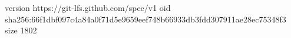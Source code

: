 version https://git-lfs.github.com/spec/v1
oid sha256:66f1dbf097c4a84a0f71d5e9659eef748b66933db3fdd307911ae28ec75348f3
size 1802
